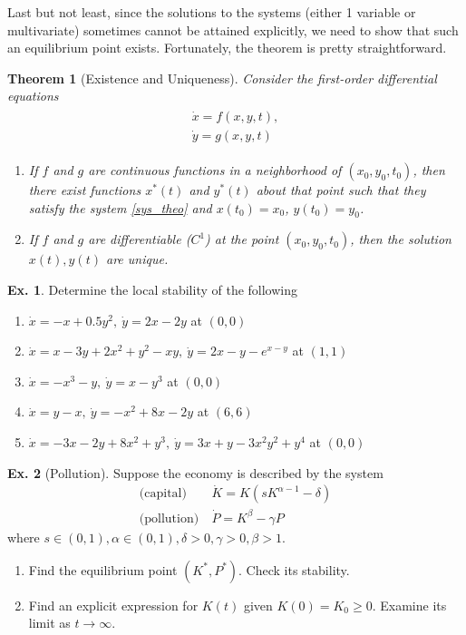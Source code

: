 \documentclass[11pt,a4paper]{book}
\newtheorem{theorem}{Theorem}[section]
\theoremstyle{definition}\newtheorem{definition}{Definition}
\theoremstyle{definition}\newtheorem{fact}{Fact}
\theoremstyle{definition}\newtheorem{remark}{Remark}
\theoremstyle{definition}\newtheorem{ex}{Ex.}
\theoremstyle{definition}\newtheorem{project}{Project}
\theoremstyle{definition}\newtheorem{problem}{Problem}
\theoremstyle{definition}\newtheorem{example}{Example}
\newenvironment{ftheorem}
{\begin{mdframed}\begin{theorem}}
		{\end{theorem}\end{mdframed}}
\numberwithin{theorem}{section}
\numberwithin{corollary}{chapter}
\numberwithin{assumption}{chapter}
\numberwithin{definition}{chapter}
\numberwithin{prop}{chapter}
\numberwithin{notation}{chapter}
\numberwithin{problem}{chapter}
\numberwithin{example}{chapter}
\numberwithin{fact}{chapter}
\numberwithin{ex}{chapter}
\begin{document}
	Last but not least, since the solutions to the systems (either 1 variable or multivariate) sometimes cannot be attained explicitly, we need to show that such an equilibrium point exists. Fortunately, the theorem is pretty straightforward.
	\begin{ftheorem}[Existence and Uniqueness]
		Consider the first-order differential equations
		\begin{align}
			\begin{matrix}
				\dot{x} = f(x, y, t), \\
				\dot{y} = g(x, y, t) \label{sys_theo}
			\end{matrix}
		\end{align}
		\begin{enumerate}
			\item If $f$ and $g$ are continuous functions in a neighborhood of $(x_0, y_0, t_0)$, then there exist functions $x^*(t)$ and $y^*(t)$ about that point such that they satisfy the system \eqref{sys_theo} and $x(t_0) = x_0$, $y(t_0) = y_0$.
			\item If $f$ and $g$ are differentiable ($C^1$) at the point $(x_0, y_0, t_0)$, then the solution $x(t), y(t)$ are unique.
		\end{enumerate}
	\end{ftheorem}
	
	\begin{ex}
		Determine the local stability of the following \citep[p.254]{sydsaeter2008further}
		\begin{enumerate}[label=(\alph*)]
			\item $\dot{x} = - x + 0.5 y^2, \ \dot{y} = 2x - 2y$ at $(0,0)$
			\item $\dot{x} = x - 3y + 2x^2 + y^2 - xy, \ \dot{y} = 2x - y - e^{x-y}$ at $(1,1)$
			\item $\dot{x} = -x^3 - y, \ \dot{y} = x - y^3$ at $(0,0)$
			\item $\dot{x} = y - x, \ \dot{y} = -x^2 + 8x - 2y$ at $(6,6)$
			\item $\dot{x} = -3x - 2y + 8x^2 + y^3, \ \dot{y} = 3x + y - 3 x^2 y^2 + y^4$ at $(0,0)$
		\end{enumerate}	
	\end{ex}
	
	\begin{ex}[Pollution]
		Suppose the economy is described by the system
		\begin{align*}
			\text{(capital)} & \ \dot{K} = K (s K^{\alpha-1} - \delta) \\
			\text{(pollution)} & \ \dot{P} = K^\beta - \gamma P
		\end{align*}
		where $s\in (0,1), \alpha \in (0,1), \delta > 0, \gamma > 0, \beta > 1$.
		\begin{enumerate}
			\item Find the equilibrium point $(K^*, P^*)$. Check its stability.
			\item Find an explicit expression for $K(t)$ given $K(0) = K_0 \geq 0$. Examine its limit as $t\to\infty$.
		\end{enumerate}
	\end{ex}
	
\end{document}
